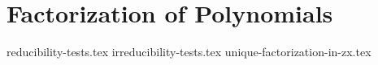 \chapter{Factorization of Polynomials}
{reducibility-tests.tex}
{irreducibility-tests.tex}
{unique-factorization-in-zx.tex}
